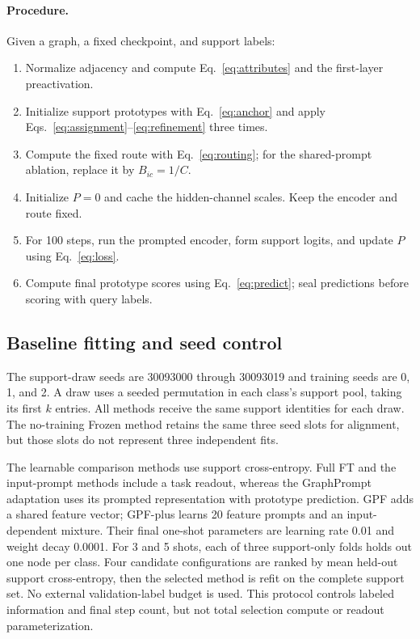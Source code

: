 \paragraph{Procedure.}
Given a graph, a fixed checkpoint, and support labels:
\begin{enumerate}
\item Normalize adjacency and compute Eq.~\eqref{eq:attributes} and the first-layer preactivation.
\item Initialize support prototypes with Eq.~\eqref{eq:anchor} and apply Eqs.~\eqref{eq:assignment}--\eqref{eq:refinement} three times.
\item Compute the fixed route with Eq.~\eqref{eq:routing}; for the shared-prompt ablation, replace it by $B_{ic}=1/C$.
\item Initialize $P=0$ and cache the hidden-channel scales. Keep the encoder and route fixed.
\item For 100 steps, run the prompted encoder, form support logits, and update $P$ using Eq.~\eqref{eq:loss}.
\item Compute final prototype scores using Eq.~\eqref{eq:predict}; seal predictions before scoring with query labels.
\end{enumerate}

\subsection{Baseline fitting and seed control}
The support-draw seeds are 30093000 through 30093019 and training seeds are 0, 1, and 2. A draw uses a seeded permutation in each class's support pool, taking its first $k$ entries. All methods receive the same support identities for each draw. The no-training Frozen method retains the same three seed slots for alignment, but those slots do not represent three independent fits.

The learnable comparison methods use support cross-entropy. Full FT and the input-prompt methods include a task readout, whereas the GraphPrompt adaptation uses its prompted representation with prototype prediction. GPF adds a shared feature vector; GPF-plus learns 20 feature prompts and an input-dependent mixture. Their final one-shot parameters are learning rate 0.01 and weight decay 0.0001. For 3 and 5 shots, each of three support-only folds holds out one node per class. Four candidate configurations are ranked by mean held-out support cross-entropy, then the selected method is refit on the complete support set. No external validation-label budget is used. This protocol controls labeled information and final step count, but not total selection compute or readout parameterization.

